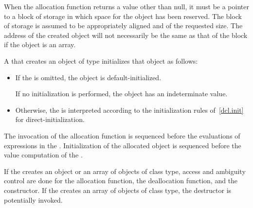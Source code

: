 \pnum
\begin{note}
When the allocation function returns a value other than null, it must be
a pointer to a block of storage in which space for the object has been
reserved. The block of storage is assumed to be appropriately aligned
and of the requested size. The address of the created object will not
necessarily be the same as that of the block if the object is an array.
\end{note}

\pnum
{}%
%
%
%
%
%
%
A  that creates an object of type 
initializes that object as follows:

\begin{itemize}
\item If the  is omitted, the object is
default-initialized. \begin{note} If no initialization
is performed, the object has an indeterminate value. \end{note}

\item Otherwise, the  is interpreted according to
the initialization rules of~\ref{dcl.init} for direct-initialization.
\end{itemize}

\pnum
{}%
%
The invocation of the allocation function is sequenced before
the evaluations of expressions in the . Initialization of
the allocated object is sequenced before the
%
value computation of the
.

\pnum
If the  creates an object or an array of
objects of class type, access and ambiguity control are done for the
allocation function, the deallocation function, and
the constructor. If the 
creates an array of objects of class type, the destructor is potentially
invoked.

